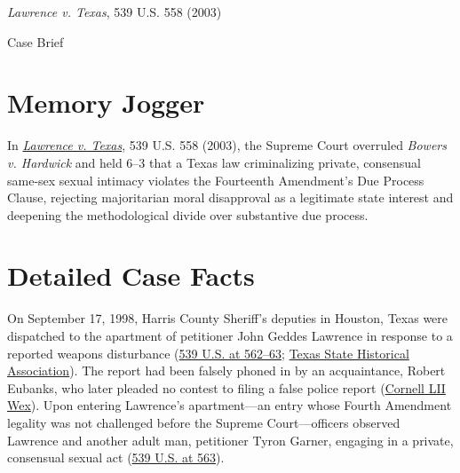 \documentclass[12pt]{article}
\begin{document}
\begin{center}
{\LARGE \textit{Lawrence v. Texas}, 539 U.S. 558 (2003)\par}
\vspace{0.8em}
{\large Case Brief\par}
\end{center}
\vspace{1em}

\section{Memory Jogger}
In \href{https://www.courtlistener.com/opinion/130160/lawrence-v-texas/}{\textit{Lawrence v. Texas}}, 539 U.S. 558 (2003), the Supreme Court overruled \textit{Bowers v. Hardwick} and held 6--3 that a Texas law criminalizing private, consensual same-sex sexual intimacy violates the Fourteenth Amendment's Due Process Clause, rejecting majoritarian moral disapproval as a legitimate state interest and deepening the methodological divide over substantive due process.

\section{Detailed Case Facts}
On September 17, 1998, Harris County Sheriff's deputies in Houston, Texas were dispatched to the apartment of petitioner John Geddes Lawrence in response to a reported weapons disturbance (\href{https://www.law.cornell.edu/supremecourt/text/02-102}{539 U.S. at 562--63}; \href{https://www.tshaonline.org/handbook/entries/lawrence-v-texas}{Texas State Historical Association}). The report had been falsely phoned in by an acquaintance, Robert Eubanks, who later pleaded no contest to filing a false police report (\href{https://www.law.cornell.edu/wex/lawrence_v._texas}{Cornell LII Wex}). Upon entering Lawrence's apartment---an entry whose Fourth Amendment legality was not challenged before the Supreme Court---officers observed Lawrence and another adult man, petitioner Tyron Garner, engaging in a private, consensual sexual act (\href{https://www.law.cornell.edu/supremecourt/text/02-102}{539 U.S. at 563}).
\end{document}

